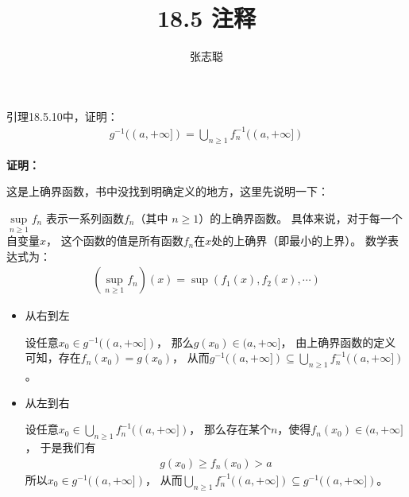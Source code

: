 \documentclass{article}
\begin{document}
\title{18.5 注释}
\author{张志聪}
\maketitle

\begin{zremark}
  引理18.5.10中，证明：
  \begin{align*}
    g^{-1}((a, +\infty]) = \bigcup\limits_{n \geq 1} f_n^{-1}((a, +\infty])
  \end{align*}
\end{zremark}

\textbf{证明：}

这是上确界函数，书中没找到明确定义的地方，这里先说明一下：

$\sup\limits_{n \geq 1} f_n$ 表示一系列函数${f_n}$（其中 $n \geq 1$）的上确界函数。
具体来说，对于每一个自变量$x$，
这个函数的值是所有函数$f_n$在$x$处的上确界（即最小的上界）。
数学表达式为：
\begin{align*}
  \left( \sup\limits_{n \geq 1} f_n \right)(x) = \sup(f_1(x), f_2(x), \cdots)
\end{align*}

\begin{itemize}
  \item 从右到左

        设任意$x_0 \in g^{-1}((a, +\infty])$，
        那么$g(x_0) \in (a, +\infty]$，
        由上确界函数的定义可知，存在$f_n(x_0) = g(x_0)$，
        从而$g^{-1}((a, +\infty]) \subseteq \bigcup\limits_{n \geq 1} f_n^{-1}((a, +\infty])$。

  \item 从左到右

        设任意$x_0 \in \bigcup\limits_{n \geq 1} f_n^{-1}((a, +\infty])$，
        那么存在某个$n$，使得$f_n(x_0) \in (a, +\infty]$，
        于是我们有
        \begin{align*}
          g(x_0) \geq f_n(x_0) > a
        \end{align*}
        所以$x_0 \in g^{-1}((a, +\infty])$，
        从而$\bigcup\limits_{n \geq 1} f_n^{-1}((a, +\infty]) \subseteq g^{-1}((a, +\infty])$。
\end{itemize}

\end{document}
